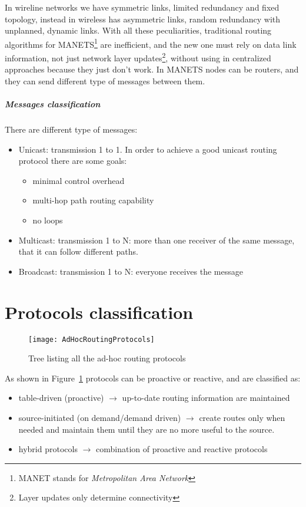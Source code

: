 In wireline networks we have symmetric links, limited redundancy and fixed
topology, instead in wireless has asymmetric links, random redundancy with
unplanned, dynamic links. With all these peculiarities, traditional routing
algorithms for MANETS\footnote{MANET stands for \textit{Metropolitan Area
    Network}} are inefficient, and the new one must rely on data link
information, not just network layer updates\footnote{Layer updates only
  determine connectivity}, without using in centralized approaches because they
just don't work. In MANETS nodes can be routers, and they can send different
type of messages between them.
\subparagraph*{Messages classification} There are different type of messages:
\begin{itemize}
\item Unicast: transmission 1 to 1. In order to achieve a good unicast routing
  protocol there are some goals:
  \begin{itemize}
  \item minimal control overhead
  \item multi-hop path routing capability
  \item no loops
  \end{itemize}
\item Multicast: transmission 1 to N: more than one receiver of the same
message, that it can follow different paths.
\item Broadcast: transmission 1 to N: everyone receives the message
\end{itemize}

\section{Protocols classification}

\begin{figure}[H]
  \centering
  \texttt{[image: AdHocRoutingProtocols]}
  \caption{Tree listing all the ad-hoc routing protocols}
  \label{fig:mac:adHocRoutingProtocols}
\end{figure}

As shown in Figure~\ref{fig:mac:adHocRoutingProtocols} protocols can be
proactive or reactive, and are classified as:
\begin{itemize}
\item table-driven (proactive) $\to$ up-to-date routing information are
  maintained
\item source-initiated (on demand/demand driven) $\to$ create routes only when
needed and maintain them until they are no more useful to the source.
\item hybrid protocols $\to$ combination of proactive and reactive protocols
\end{itemize}

